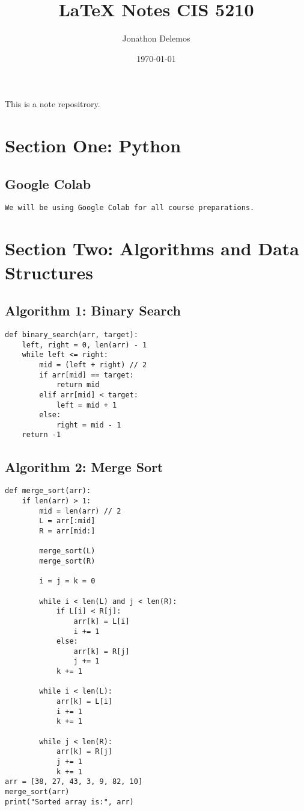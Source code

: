 \documentclass{article}
\title{LaTeX Notes CIS 5210}
\author{Jonathon Delemos}
\date{\today}
\begin{document}
\maketitle

This is a note repositrory.

\section{Section One: Python}
\subsection{Google Colab}
\begin{verbatim}
We will be using Google Colab for all course preparations.
\end{verbatim}
\section{Section Two: Algorithms and Data Structures}
\subsection{Algorithm 1: Binary Search}
\begin{verbatim}
def binary_search(arr, target):
    left, right = 0, len(arr) - 1
    while left <= right:
        mid = (left + right) // 2
        if arr[mid] == target:
            return mid
        elif arr[mid] < target:
            left = mid + 1
        else:
            right = mid - 1
    return -1
\end{verbatim}
\subsection{Algorithm 2: Merge Sort}
\begin{verbatim}
def merge_sort(arr):
    if len(arr) > 1:
        mid = len(arr) // 2
        L = arr[:mid]
        R = arr[mid:]

        merge_sort(L)
        merge_sort(R)

        i = j = k = 0

        while i < len(L) and j < len(R):
            if L[i] < R[j]:
                arr[k] = L[i]
                i += 1
            else:
                arr[k] = R[j]
                j += 1
            k += 1

        while i < len(L):
            arr[k] = L[i]
            i += 1
            k += 1

        while j < len(R):
            arr[k] = R[j]
            j += 1
            k += 1
arr = [38, 27, 43, 3, 9, 82, 10]
merge_sort(arr)
print("Sorted array is:", arr)
\end{verbatim}
\end{document}

